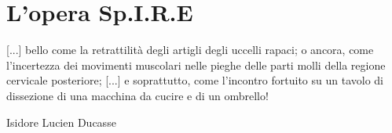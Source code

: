 
\chapter{L'opera Sp.I.R.E}
\label{chp:L'opera Sp.I.R.E}

\epigraph{[...] bello come la retrattilità degli artigli degli uccelli rapaci; o ancora, come l'incertezza dei movimenti muscolari nelle pieghe delle parti molli della regione cervicale posteriore; [...] e soprattutto, come l'incontro fortuito su un tavolo di dissezione di una macchina da cucire e di un ombrello!}{Isidore Lucien Ducasse \\}

